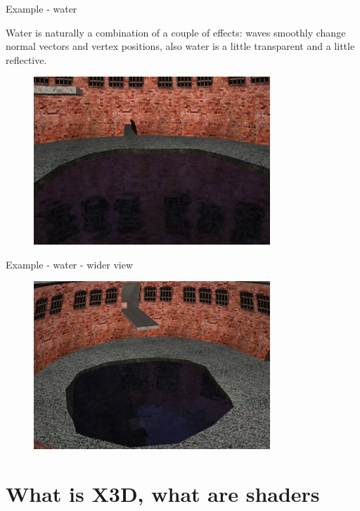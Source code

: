 \documentclass{beamer}
\begin{document}
\begin{frame}{Example - water}

Water is naturally a combination of a couple of effects: waves smoothly change normal vectors and vertex positions, also water is a little transparent and a little reflective.

\begin{figure}
  \centering
  \includegraphics[width=3.5in]{water_shaders_1}
\end{figure}
\end{frame}

\begin{frame}{Example - water - wider view}
\begin{figure}
  \centering
  \includegraphics[width=3.5in]{water_shaders_0}
\end{figure}
\end{frame}

\section{What is X3D, what are shaders}
\end{document}
